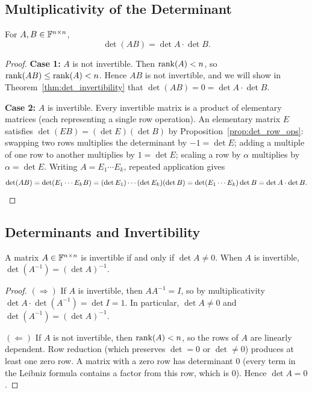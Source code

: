 \documentclass[11pt,a4paper]{article}
\begin{document}
\subsection{Multiplicativity of the Determinant}

\begin{theorem}[Multiplicativity]
\label{thm:det_mult}
For $A, B \in \mathbb{F}^{n \times n}$,
\[
  \det(AB) = \det A \cdot \det B.
\]
\end{theorem}

\begin{proof}
\textbf{Case 1:} $A$ is not invertible.  Then $\operatorname{rank}(A) < n$, so
$\operatorname{rank}(AB) \leq \operatorname{rank}(A) < n$.  Hence $AB$ is not invertible, and we
will show in Theorem~\ref{thm:det_invertibility} that
$\det(AB) = 0 = \det A \cdot \det B$.

\textbf{Case 2:} $A$ is invertible.  Every invertible matrix is a product
of elementary matrices (each representing a single row operation).
An elementary matrix $E$ satisfies $\det(EB) = (\det E)(\det B)$ by
Proposition~\ref{prop:det_row_ops}: swapping two rows multiplies the
determinant by $-1 = \det E$; adding a multiple of one row to another
multiplies by $1 = \det E$; scaling a row by $\alpha$ multiplies by
$\alpha = \det E$.  Writing $A = E_1 \cdots E_k$, repeated application
gives
\[
  \det(AB) = \det(E_1 \cdots E_k B)
  = (\det E_1) \cdots (\det E_k)(\det B)
  = \det(E_1 \cdots E_k) \det B
  = \det A \cdot \det B. \qedhere
\]
\end{proof}

\subsection{Determinants and Invertibility}

\begin{keyresult}[title={Determinant--Invertibility Equivalence}]
\begin{theorem}
\label{thm:det_invertibility}
A matrix $A \in \mathbb{F}^{n \times n}$ is invertible if and only if $\det A \neq 0$.
When $A$ is invertible, $\det(A^{-1}) = (\det A)^{-1}$.
\end{theorem}
\end{keyresult}

\begin{proof}
$(\Rightarrow)$\; If $A$ is invertible, then $AA^{-1} = I$, so by
multiplicativity $\det A \cdot \det(A^{-1}) = \det I = 1$.  In particular,
$\det A \neq 0$ and $\det(A^{-1}) = (\det A)^{-1}$.

$(\Leftarrow)$\; If $A$ is not invertible, then $\operatorname{rank}(A) < n$, so the
rows of $A$ are linearly dependent.  Row reduction (which preserves
$\det = 0$ or $\det \neq 0$) produces at least one zero row.  A matrix
with a zero row has determinant $0$ (every term in the Leibniz formula
contains a factor from this row, which is $0$).  Hence $\det A = 0$.
\end{proof}
\end{document}
